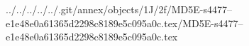../../../../../.git/annex/objects/1J/2f/MD5E-s4477--e1e48e0a61365d2298c8189e5c095a0c.tex/MD5E-s4477--e1e48e0a61365d2298c8189e5c095a0c.tex